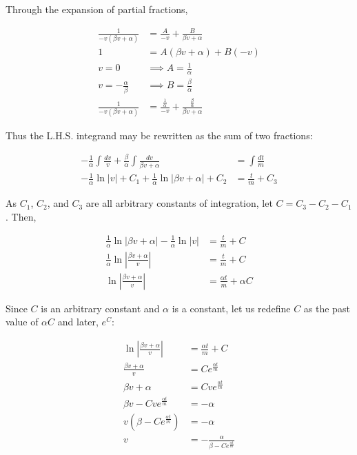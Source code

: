 \documentclass{article}
\begin{document}
    Through the expansion of partial fractions,

    \begin{align*}
        \frac{1}{-v(\beta v+\alpha)}  &= \frac{A}{-v} + \frac{B}{\beta v+\alpha} \\
        1                       &= A(\beta v+\alpha) + B(-v) \\
        v = 0                   &\implies A = \frac{1}{\alpha} \\
        v = -\frac{\alpha}{\beta}   &\implies B = \frac{\beta}{\alpha} \\
        \frac{1}{-v(\beta v + \alpha)}  &= \frac{\frac{1}{\alpha}}{-v} + \frac{\frac{\beta}{\alpha}}{\beta v + \alpha}
    \end{align*}

    Thus the L.H.S. integrand may be rewritten as the sum of two fractions:

    \begin{align*}
        -\frac{1}{\alpha}\int \frac{dv}{v} + \frac{\beta}{\alpha} \int \frac{dv}{\beta v + \alpha}  &= \int \frac{dt}{m} \\
        -\frac{1}{\alpha}\ln{|v|} + C_1 + \frac{1}{\alpha}\ln{|\beta v + \alpha|} + C_2             &= \frac{t}{m} + C_3
    \end{align*}

    As $C_1$, $C_2$, and $C_3$ are all arbitrary constants of integration, let $C = C_3 - C_2 - C_1$. Then,

    \begin{align*}
        \frac{1}{\alpha}\ln{|\beta v + \alpha|} - \frac{1}{\alpha}\ln{|v|}      &= \frac{t}{m} + C \\
        \frac{1}{\alpha}\ln{\left|\frac{\beta v + \alpha}{v}\right|}            &= \frac{t}{m} + C \\
        \ln{\left|\frac{\beta v + \alpha}{v}\right|}                            &= \frac{\alpha t}{m} + \alpha C
    \end{align*}

    Since $C$ is an arbitrary constant and $\alpha$ is a constant, let us redefine $C$ as the past value of $\alpha C$ and later, $e^C$:

    \begin{align*}
        \ln{\left|\frac{\beta v + \alpha}{v}\right|}                            &= \frac{\alpha t}{m} + C \\
        \frac{\beta v + \alpha}{v}                                 &= Ce^{\frac{\alpha t}{m}} \\
        \beta v + \alpha                                            &= Cve^{\frac{\alpha t}{m}} \\
        \beta v - Cve^{\frac{\alpha t}{m}}                          &= -\alpha \\
        v \left(\beta - Ce^{\frac{\alpha t}{m}}\right)              &= -\alpha \\
        v                                                               &= -\frac{\alpha}{\beta - Ce^{\frac{\alpha t}{m}}}
    \end{align*}
\end{document}
